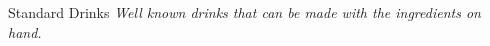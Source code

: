 \begin{Group}{Standard Drinks}
\emph{Well known drinks that can be made with the ingredients on hand.}



\end{Group}
